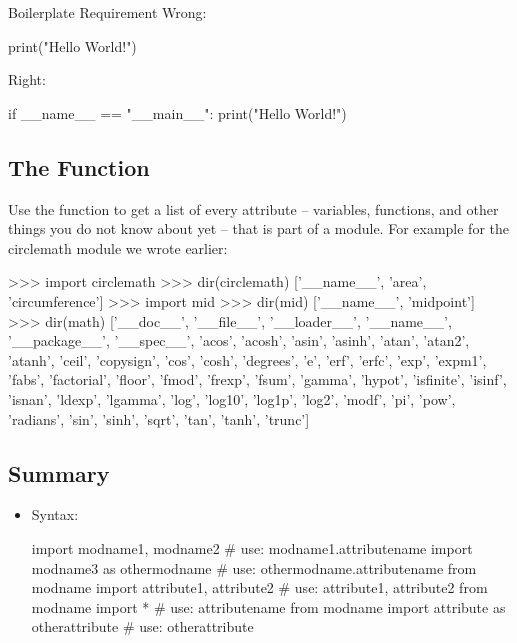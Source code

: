 \documentclass[11pt]{cselabheader}
\begin{document}
{\begin{infobox}{Boilerplate Requirement}
  Wrong:

  \begin{python3code}
print("Hello World!")
  \end{python3code}

  Right:

  \begin{python3code}
if __name__ == "__main__":
    print("Hello World!")
  \end{python3code}
\end{infobox}

\subsection{The \protect{} Function}

Use the  function to get a list of every attribute --
variables, functions, and other things you do not know about yet -- that is part
of a module. For example for the circlemath module we wrote earlier:

\begin{pyconcode}
>>> import circlemath
>>> dir(circlemath)
['__name__', 'area', 'circumference']
>>> import mid
>>> dir(mid)
['__name__', 'midpoint']
>>> dir(math)
['__doc__', '__file__', '__loader__', '__name__', '__package__', '__spec__', 'acos',
'acosh', 'asin', 'asinh', 'atan', 'atan2', 'atanh', 'ceil', 'copysign', 'cos', 'cosh',
'degrees', 'e', 'erf', 'erfc', 'exp', 'expm1', 'fabs', 'factorial', 'floor', 'fmod',
'frexp', 'fsum', 'gamma', 'hypot', 'isfinite', 'isinf', 'isnan', 'ldexp', 'lgamma',
'log', 'log10', 'log1p', 'log2', 'modf', 'pi', 'pow', 'radians', 'sin', 'sinh', 'sqrt',
'tan', 'tanh', 'trunc']
\end{pyconcode}

\subsection{Summary}
\label{subsec:modules.sum}

\begin{itemize}
  \item Syntax:

    \begin{python3code}
import modname1, modname2 # use: modname1.attributename
import modname3 as othermodname # use: othermodname.attributename
from modname import attribute1, attribute2 # use: attribute1, attribute2
from modname import * # use: attributename
from modname import attribute as otherattribute # use: otherattribute
    \end{python3code}


\end{itemize}}
\end{document}
